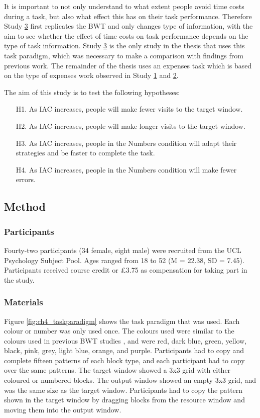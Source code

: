 It is important to not only understand to what extent people avoid time costs during a task, but also what effect this has on their task performance. Therefore Study \hyperref[st:Study3]{3} first replicates the BWT and only changes type of information, with the aim to see whether the effect of time costs on task performance depends on the type of task information. Study \hyperref[st:Study3]{3} is the only study in the thesis that uses this task paradigm, which was necessary to make a comparison with findings from previous work. The remainder of the thesis uses an expenses task which is based on the type of expenses work observed in Study \hyperref[st:Study1]{1} and \hyperref[st:Study2]{2}. 

The aim of this study is to test the following hypotheses:

\begin{itemize}
\item [H1.]
As IAC increases, people will make fewer visits to the target window. 
\item [H2.]
As IAC increases, people will make longer visits to the target window.
\item [H3.]
As IAC increases, people in the Numbers condition will adapt their strategies and be faster to complete the task.
\item [H4.]
As IAC increases, people in the Numbers condition will make fewer errors.
\end{itemize}

\subsection{Method}
\subsubsection{Participants}
Fourty-two participants (34 female, eight male) were recruited from the UCL Psychology Subject Pool. Ages ranged from 18 to 52 (M = 22.38, SD = 7.45). Participants received course credit or \pounds3.75 as compensation for taking part in the study. 

\subsubsection{Materials}
Figure \ref{fig:ch4_taskparadigm} shows the task paradigm that was used. Each colour or number was only used once. The colours used were similar to the colours used in previous BWT studies \citep[e.g.][]{Gray2006, Morgan2009}, and were red, dark blue, green, yellow, black, pink, grey, light blue, orange, and purple.
Participants had to copy and complete fifteen patterns of each block type, and each participant had to copy over the same patterns. The target window showed a 3x3 grid with either coloured or numbered blocks. The output window showed an empty 3x3 grid, and was the same size as the target window. Participants had to copy the pattern shown in the target window by dragging blocks from the resource window and moving them into the output window. 

